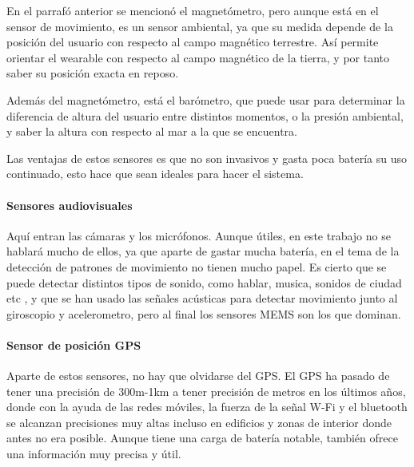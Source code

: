 \documentclass[12pt]{article}
\numberwithin{equation}{section}
\begin{document}
En el parrafó anterior se mencionó el magnetómetro, pero aunque está en el sensor de movimiento, es un sensor ambiental, ya que su medida depende de la posición del usuario con respecto al campo magnético terrestre. Así permite orientar el wearable con respecto al campo magnético de la tierra, y por tanto saber su posición exacta en reposo.

Además del magnetómetro, está el barómetro, que puede usar para determinar la diferencia de altura del usuario entre distintos momentos, o la presión ambiental, y saber la altura con respecto al mar a la que se encuentra.

Las ventajas de estos sensores es que no son invasivos y gasta poca batería su uso continuado, esto hace que sean ideales para hacer el sistema.
\paragraph{Sensores audiovisuales}

Aquí entran las cámaras y los micrófonos. Aunque útiles, en este trabajo no se hablará mucho de ellos, ya que aparte de gastar mucha batería, en el tema de la detección de patrones de movimiento no tienen mucho papel. Es cierto que se puede detectar distintos tipos de sonido, como hablar, musica, sonidos de ciudad etc \cite{Lu:2009:SSS:1555816.1555834}, y que se han usado las señales acústicas para detectar movimiento junto al giroscopio y acelerometro\cite{doi:10.1155/2014/503291}, pero al final los sensores MEMS son los que dominan.

\paragraph{Sensor de posición GPS}

Aparte de estos sensores, no hay que olvidarse del GPS. El GPS ha pasado de tener una precisión de 300m-1km\cite{vonWatzdorf:2010:APD:1899662.1899664} a tener precisión de metros en los últimos años\cite{s213}, donde con la ayuda de las redes móviles, la fuerza de la señal W-Fi y el bluetooth se alcanzan precisiones muy altas incluso en edificios y zonas de interior donde antes no era posible. Aunque tiene una carga de batería notable, también ofrece una información muy precisa y útil.
\end{document}
